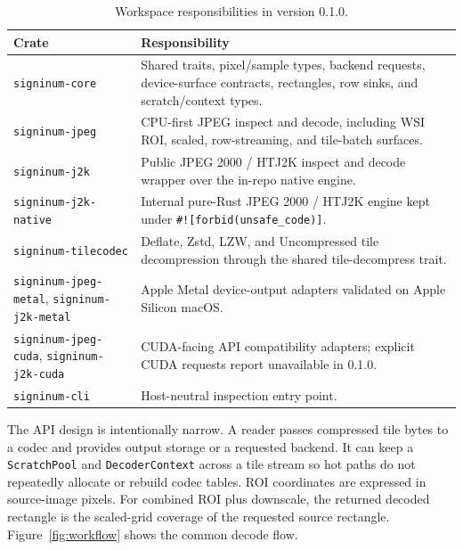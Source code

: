 \documentclass[11pt]{article}
\newcommand{\crate}[1]{\texttt{#1}}
\begin{document}
\begin{table}[t]
\centering
\caption{Workspace responsibilities in version 0.1.0.}
\label{tab:crates}
\begin{tabularx}{\linewidth}{@{}lY@{}}
\toprule
Crate & Responsibility \\
\midrule
\crate{signinum-core} & Shared traits, pixel/sample types, backend requests,
device-surface contracts, rectangles, row sinks, and scratch/context types. \\
\crate{signinum-jpeg} & CPU-first JPEG inspect and decode, including WSI ROI,
scaled, row-streaming, and tile-batch surfaces. \\
\crate{signinum-j2k} & Public JPEG 2000 / HTJ2K inspect and decode wrapper over
the in-repo native engine. \\
\crate{signinum-j2k-native} & Internal pure-Rust JPEG 2000 / HTJ2K engine kept
under \texttt{\#![forbid(unsafe\_code)]}. \\
\crate{signinum-tilecodec} & Deflate, Zstd, LZW, and Uncompressed tile
decompression through the shared tile-decompress trait. \\
\crate{signinum-jpeg-metal}, \crate{signinum-j2k-metal} & Apple Metal
device-output adapters validated on Apple Silicon macOS. \\
\crate{signinum-jpeg-cuda}, \crate{signinum-j2k-cuda} & CUDA-facing API
compatibility adapters; explicit CUDA requests report unavailable in 0.1.0. \\
\crate{signinum-cli} & Host-neutral inspection entry point. \\
\bottomrule
\end{tabularx}
\end{table}

The API design is intentionally narrow. A reader passes compressed tile bytes
to a codec and provides output storage or a requested backend. It can keep a
\texttt{ScratchPool} and \texttt{DecoderContext} across a tile stream so hot
paths do not repeatedly allocate or rebuild codec tables. ROI coordinates are
expressed in source-image pixels. For combined ROI plus downscale, the returned
decoded rectangle is the scaled-grid coverage of the requested source
rectangle. Figure~\ref{fig:workflow} shows the common decode flow.
\end{document}
